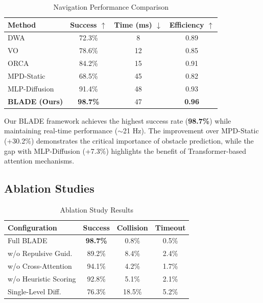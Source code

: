 \documentclass[letterpaper, 10 pt, conference]{ieeeconf}
\begin{document}
\begin{table}[t]
    \centering
    \caption{Navigation Performance Comparison}
    \label{tab:navigation}
    \begin{tabular*}{\columnwidth}{@{\extracolsep{\fill}}lccc@{}}
        \toprule
        \textbf{Method} & \textbf{Success} $\uparrow$ & \textbf{Time (ms)} $\downarrow$ & \textbf{Efficiency} $\uparrow$ \\
        \midrule
        DWA~\cite{fox1997dynamic} & 72.3\% & 8 & 0.89 \\
        VO~\cite{fiorini1998motion} & 78.6\% & 12 & 0.85 \\
        ORCA~\cite{van2011reciprocal} & 84.2\% & 15 & 0.91 \\
        MPD-Static~\cite{carvalho2023motion} & 68.5\% & 45 & 0.82 \\
        MLP-Diffusion & 91.4\% & 48 & 0.93 \\
        \textbf{BLADE (Ours)} & \textbf{98.7\%} & 47 & \textbf{0.96} \\
        \bottomrule
    \end{tabular*}
\end{table}

Our BLADE framework achieves the highest success rate (\textbf{98.7\%}) while maintaining real-time performance ($\sim$21 Hz). The improvement over MPD-Static (+30.2\%) demonstrates the critical importance of obstacle prediction, while the gap with MLP-Diffusion (+7.3\%) highlights the benefit of Transformer-based attention mechanisms.

\subsection{Ablation Studies}

\begin{table}[t]
    \centering
    \caption{Ablation Study Results}
    \label{tab:ablation}
    \begin{tabular*}{\columnwidth}{@{\extracolsep{\fill}}lccc@{}}
        \toprule
        \textbf{Configuration} & \textbf{Success} & \textbf{Collision} & \textbf{Timeout} \\
        \midrule
        Full BLADE & \textbf{98.7\%} & 0.8\% & 0.5\% \\
        w/o Repulsive Guid. & 89.2\% & 8.4\% & 2.4\% \\
        w/o Cross-Attention & 94.1\% & 4.2\% & 1.7\% \\
        w/o Heuristic Scoring & 92.8\% & 5.1\% & 2.1\% \\
        Single-Level Diff. & 76.3\% & 18.5\% & 5.2\% \\
        \bottomrule
    \end{tabular*}
\end{table}
\end{document}
